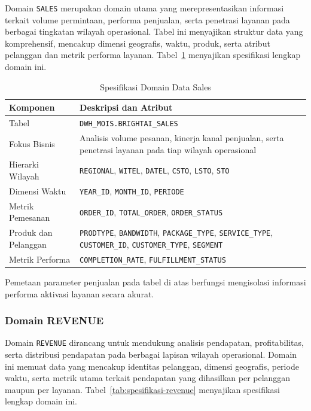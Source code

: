 Domain \texttt{SALES} merupakan domain utama yang merepresentasikan informasi terkait volume permintaan, performa penjualan, serta penetrasi layanan pada berbagai tingkatan wilayah operasional. Tabel ini menyajikan struktur data yang komprehensif, mencakup dimensi geografis, waktu, produk, serta atribut pelanggan dan metrik performa layanan. Tabel~\ref{tab:spesifikasi-sales} menyajikan spesifikasi lengkap domain ini.

\begin{table}[htbp]
\centering
\caption{Spesifikasi Domain Data Sales}
\label{tab:spesifikasi-sales}
\begin{tabular}{|p{4cm}|p{9cm}|}
\hline
\textbf{Komponen} & \textbf{Deskripsi dan Atribut} \\
\hline
Tabel & \texttt{DWH\_MOIS.BRIGHTAI\_SALES} \\
\hline
Fokus Bisnis & Analisis volume pesanan, kinerja kanal penjualan, serta penetrasi layanan pada tiap wilayah operasional \\
\hline
Hierarki Wilayah & \texttt{REGIONAL}, \texttt{WITEL}, \texttt{DATEL}, \texttt{CSTO}, \texttt{LSTO}, \texttt{STO} \\
\hline
Dimensi Waktu & \texttt{YEAR\_ID}, \texttt{MONTH\_ID}, \texttt{PERIODE} \\
\hline
Metrik Pemesanan & \texttt{ORDER\_ID}, \texttt{TOTAL\_ORDER}, \texttt{ORDER\_STATUS} \\
\hline
Produk dan Pelanggan & \texttt{PRODTYPE}, \texttt{BANDWIDTH}, \texttt{PACKAGE\_TYPE}, \texttt{SERVICE\_TYPE}, \texttt{CUSTOMER\_ID}, \texttt{CUSTOMER\_TYPE}, \texttt{SEGMENT} \\
\hline
Metrik Performa & \texttt{COMPLETION\_RATE}, \texttt{FULFILLMENT\_STATUS} \\
\hline
\end{tabular}
\end{table}

Pemetaan parameter penjualan pada tabel di atas berfungsi mengisolasi informasi performa aktivasi layanan secara akurat.

\subsubsection{Domain REVENUE}

Domain \texttt{\texttt{REVENUE}} dirancang untuk mendukung analisis pendapatan, profitabilitas, serta distribusi pendapatan pada berbagai lapisan wilayah operasional. Domain ini memuat data yang mencakup identitas pelanggan, dimensi geografis, periode waktu, serta metrik utama terkait pendapatan yang dihasilkan per pelanggan maupun per layanan. Tabel~\ref{tab:spesifikasi-revenue} menyajikan spesifikasi lengkap domain ini.

